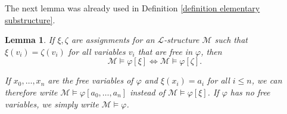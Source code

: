 \documentclass[a4paper, 11pt]{amsart}
\newtheorem{lemma}[lemma]{Lemma}
\theoremstyle{remark}
\newcommand{\cL}{\mathcal L}
\newcommand{\cM}{\mathcal M}
\begin{document}

The next lemma was already used in Definition \ref{definition elementary substructure}. 

\begin{lemma} 
\label{truth of formulas under substitution} 
If $\xi,\zeta$ are assignments for an $\cL$-structure $\cM$ such that $\xi(v_i)=\zeta(v_i)$ for all variables $v_i$ that are free in $\varphi$, then 
$$ \cM \models \varphi[\xi] \Longleftrightarrow \cM \models \varphi[\zeta].$$ 

If $x_0,\dots,x_n$ are the free variables of $\varphi$ and $\xi(x_i)=a_i$ for all $i\leq n$, we can therefore write $\cM \models \varphi[a_0,\dots,a_n]$ instead of $\cM \models \varphi[\xi]$. 
If $\varphi$ has no free variables, we simply write $\cM \models \varphi$. 
\end{lemma} 
\end{document}
